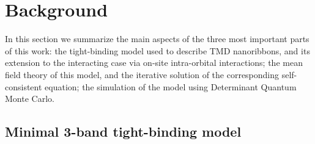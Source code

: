 
\section{Background}
\label{sec:backg}

In this section we summarize the main aspects of the three most important parts of this work: the tight-binding model used to describe TMD nanoribbons, and its extension to the interacting case via on-site intra-orbital interactions; the mean field theory of this model, and the iterative solution of the corresponding self-consistent equation; the simulation of the model using Determinant Quantum Monte Carlo.

\subsection{Minimal 3-band tight-binding model}

